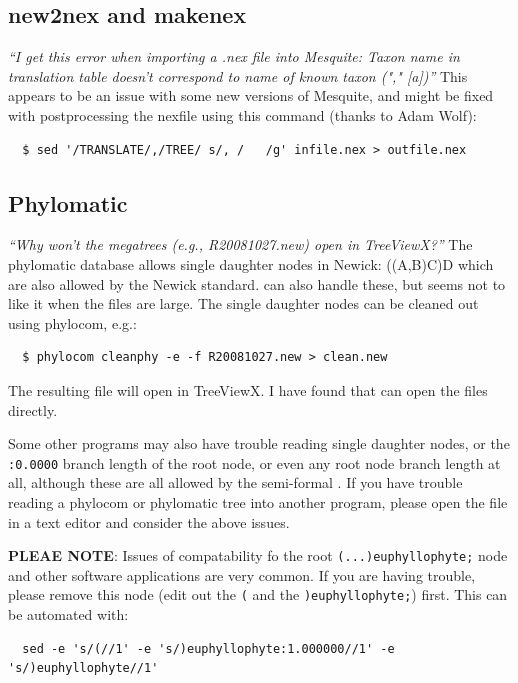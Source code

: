\documentclass[12pt,letterpaper]{article}
\begin{document}
\subsection{new2nex and makenex}

\textit{``I get this error when importing a .nex file into Mesquite:
Taxon name in translation table doesn't correspond to name of
known taxon ("," [a])''}  This appears to be an issue with some
new versions of Mesquite, and might be fixed with postprocessing the
nexfile using this command (thanks to Adam Wolf):
\begin{verbatim}
  $ sed '/TRANSLATE/,/TREE/ s/, /   /g' infile.nex > outfile.nex
\end{verbatim}


\subsection{Phylomatic}

\textit{``Why won't the megatrees (e.g., R20081027.new) open in
  TreeViewX?''} The phylomatic database allows single daughter nodes
in Newick: ((A,B)C)D which are also allowed by the Newick standard.
can also handle these, but seems not to like it when the files are
large.  The single daughter nodes can be cleaned out using phylocom,
e.g.:
\begin{verbatim}
  $ phylocom cleanphy -e -f R20081027.new > clean.new
\end{verbatim}
The resulting file will open in TreeViewX.  I have found that
 can open the
files directly.  

Some other programs may also have trouble reading single daughter
nodes, or the \texttt{:0.0000} branch length of the root node, or even
any root node branch length at all, although these are all allowed by
the semi-formal . If
you have trouble reading a phylocom or phylomatic tree into another
program, please open the file in a text editor and consider the above
issues.

{\bf PLEAE NOTE}: Issues of compatability fo the root
\verb|(...)euphyllophyte;| node and other software applications are
very common.  If you are having trouble, please remove this node
(edit out the \verb|(| and the \verb|)euphyllophyte;|) first. This can
be automated with:

\begin{footnotesize}
\begin{verbatim}
  sed -e 's/(//1' -e 's/)euphyllophyte:1.000000//1' -e 's/)euphyllophyte//1'
\end{verbatim}
\end{footnotesize}
\end{document}
